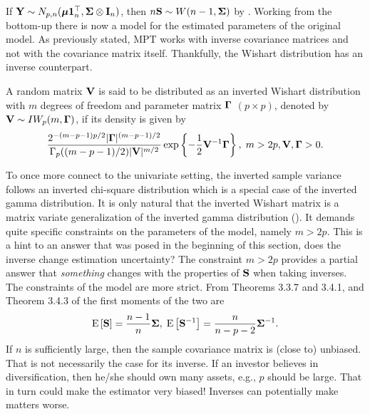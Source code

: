 \documentclass[12pt, oneside]{book}\usepackage{knitr}
\begin{document}
{If $\mathbf{Y} \sim N_{p,n}(\mbox{\boldmath$\mu$} \mathbf{1}_n^\top, \mathbf{\Sigma} \otimes \mathbf{I}_n)$, then $n\mathbf{S} \sim W(n-1, \mathbf{\Sigma})$ by \citet[Theorem 3.3.6]{GuptaNagar2000}.
Working from the bottom-up there is now a model for the estimated parameters of the original model.
As previously stated, MPT works with inverse covariance matrices and not with the covariance matrix itself. 
Thankfully, the Wishart distribution has an inverse counterpart.
\begin{definition}\label{def:inverse_wishart}
	A random matrix $\mathbf{V}$ is said to be distributed as an inverted Wishart distribution with $m$ degrees of freedom and parameter matrix $\boldsymbol{\Gamma}$ $(p \times p)$, denoted by $\mathbf{V} \sim IW_p(m, \boldsymbol{\Gamma})$, if its density is given by
	\begin{equation}\label{eqn:inverse_wishart}
	\frac{2^{-(m-p-1)p/2} |\boldsymbol{\Gamma}|^{(m-p-1)/2} }{\Gamma_p ((m-p-1)/2) |\mathbf{V}|^{m/2}} \exp\left\{ -\frac{1}{2} \mathbf{V}^{-1} \boldsymbol{\Gamma} \right\}, \; m > 2p, \mathbf{V}, \boldsymbol{\Gamma} > 0.
	\end{equation}
\end{definition}
To once more connect to the univariate setting, the inverted sample variance follows an inverted chi-square distribution which is a special case of the inverted gamma distribution.
It is only natural that the inverted Wishart matrix is a matrix variate generalization of the inverted gamma distribution (\citet[page 111]{GuptaNagar2000}). 
It demands quite specific constraints on the parameters of the model, namely $m > 2p$.
This is a hint to an answer that was posed in the beginning of this section, does the inverse change estimation uncertainty? 
The constraint $m>2p$ provides a partial answer that \textit{something} changes with the properties of $\mathbf{S}$ when taking inverses.
The constraints of the model are more strict.
From Theorems 3.3.7 and 3.4.1, and Theorem 3.4.3 of \citet{GuptaNagar2000} the first moments of the two are
$$
\operatorname{E}\left[\mathbf{S}\right] = \frac{n-1}{n} \mathbf{\Sigma}, \; 
\operatorname{E}\left[\mathbf{S}^{-1}\right] = \frac{n}{n-p-2}\mathbf{\Sigma}^{-1}.
$$
If $n$ is sufficiently large, then the sample covariance matrix is (close to) unbiased.
That is not necessarily the case for its inverse.
If an investor believes in diversification, then he/she should own many assets, e.g., $p$ should be large.
That in turn could make the estimator very biased!
Inverses can potentially make matters worse.

}
\end{document}
